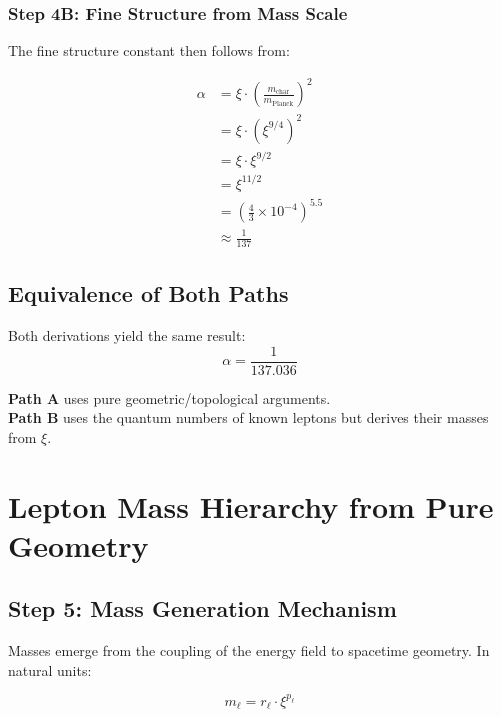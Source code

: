 \documentclass[12pt,a4paper]{article}
\newcommand{\xipar}{\xi}  %
\begin{document}
	\subsubsection{Step 4B: Fine Structure from Mass Scale}
	
	The fine structure constant then follows from:
	
	\begin{keyresult}
		\begin{align}
			\alpha &= \xipar \cdot \left(\frac{m_{\text{char}}}{m_{\text{Planck}}}\right)^2 \\
			&= \xipar \cdot \left(\xipar^{9/4}\right)^2 \\
			&= \xipar \cdot \xipar^{9/2} \\
			&= \xipar^{11/2} \\
			&= \left(\frac{4}{3} \times 10^{-4}\right)^{5.5} \\
			&\approx \frac{1}{137}
		\end{align}
	\end{keyresult}
	
	\subsection{Equivalence of Both Paths}
	
	Both derivations yield the same result:
	\begin{equation}
		\boxed{\alpha = \frac{1}{137.036}}
	\end{equation}
	
	\textbf{Path A} uses pure geometric/topological arguments.\\
	\textbf{Path B} uses the quantum numbers of known leptons but derives their masses from $\xipar$.
	
	\section{Lepton Mass Hierarchy from Pure Geometry}
	
	\subsection{Step 5: Mass Generation Mechanism}
	
	Masses emerge from the coupling of the energy field to spacetime geometry. In natural units:
	
	\begin{equation}
		m_{\ell} = r_{\ell} \cdot \xipar^{p_{\ell}}
	\end{equation}
	
\end{document}
